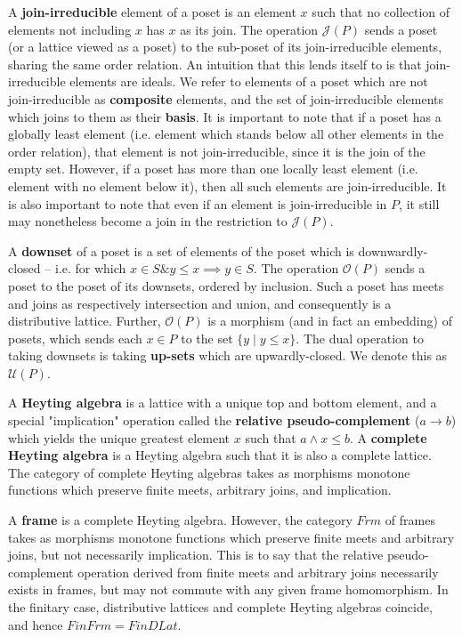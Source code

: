 \documentclass[hoptionsi,review,format=acmsmall]{acmart}
\theoremstyle{definition}
\newcommand{\Oc}{\mathcal{O}}
\newcommand{\Ucc}{\mathcal{U}}
\newcommand{\Jc}{\mathcal{J}}
\newcommand{\band}{\mathbin{\&}}
\begin{document}
A \textbf{join-irreducible} element of a poset is an element \(x\) such that no collection of elements not including \(x\) has \(x\) as its join. The operation \(\Jc(P)\) sends a poset (or a lattice viewed as a poset) to the sub-poset of its join-irreducible elements, sharing the same order relation. An intuition that this lends itself to is that join-irreducible elements are ideals. We refer to elements of a poset which are not join-irreducible as \textbf{composite} elements, and the set of join-irreducible elements which joins to them as their \textbf{basis}. It is important to note that if a poset has a globally least element (i.e. element which stands below all other elements in the order relation), that element is not join-irreducible, since it is the join of the empty set. However, if a poset has more than one locally least element (i.e. element with no element below it), then all such elements are join-irreducible. It is also important to note that even if an element is join-irreducible in \(P\), it still may nonetheless become a join in the restriction to \(\Jc(P)\).

A \textbf{downset} of a poset is a set of elements of the poset which is downwardly-closed -- i.e. for which \(x \in S \band y \le x \implies y \in S\). The operation \(\Oc(P)\) sends a poset to the poset of its downsets, ordered by inclusion. Such a poset has meets and joins as respectively intersection and union, and consequently is a distributive lattice. Further, \(\Oc(P)\) is a morphism (and in fact an embedding) of posets, which sends each \(x \in P\) to the set \(\{y \mathbin{|} y \le x\}\). The dual operation to taking downsets is taking \textbf{up-sets}  which are upwardly-closed. We denote this as \(\Ucc(P)\).

A \textbf{Heyting algebra} is a lattice with a unique top and bottom element, and a special "implication" operation called the \textbf{relative pseudo-complement} (\(a \rightarrow b\)) which yields the unique greatest element \(x\) such that \(a \wedge x \le b\). A \textbf{complete Heyting algebra} is a Heyting algebra such that it is also a complete lattice. The category of complete Heyting algebras takes as morphisms monotone functions which preserve finite meets, arbitrary joins, and implication.

A \textbf{frame} is a complete Heyting algebra. However, the category \(Frm\) of frames takes as morphisms monotone functions which preserve finite meets and arbitrary joins, but not necessarily implication. This is to say that the relative pseudo-complement operation derived from finite meets and arbitrary joins necessarily exists in frames, but may not commute with any given frame homomorphism. In the finitary case, distributive lattices and complete Heyting algebras coincide, and hence \(FinFrm = FinDLat\).
\end{document}
